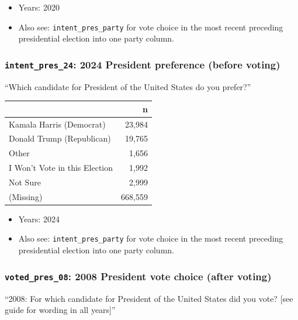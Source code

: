 \documentclass[10pt,article,oneside]{memoir}
\begin{document}
\begin{itemize}
\tightlist
\item
  Years: 2020
\item
  Also see: \texttt{intent\_pres\_party} for vote choice in the most
  recent preceding presidential election into one party column.
\end{itemize}

\subsubsection{\texorpdfstring{\texttt{intent\_pres\_24}: 2024 President
preference (before
voting)}{intent\_pres\_24: 2024 President preference (before voting)}}\label{intent_pres_24-2024-president-preference-before-voting}

``Which candidate for President of the United States do you prefer?''

\begin{table}[H]
\centering
\begin{tabular}[t]{lr}
\toprule
 & n\\
\midrule
Kamala Harris (Democrat) & 23,984\\
Donald Trump (Republican) & 19,765\\
Other & 1,656\\
I Won't Vote in this Election & 1,992\\
Not Sure & 2,999\\
(Missing) & 668,559\\
\bottomrule
\end{tabular}
\end{table}

\begin{itemize}
\tightlist
\item
  Years: 2024
\item
  Also see: \texttt{intent\_pres\_party} for vote choice in the most
  recent preceding presidential election into one party column.
\end{itemize}

\subsubsection{\texorpdfstring{\texttt{voted\_pres\_08}: 2008 President
vote choice (after
voting)}{voted\_pres\_08: 2008 President vote choice (after voting)}}\label{voted_pres_08-2008-president-vote-choice-after-voting}

``2008: For which candidate for President of the United States did you
vote? {[}see guide for wording in all years{]}''
\end{document}
